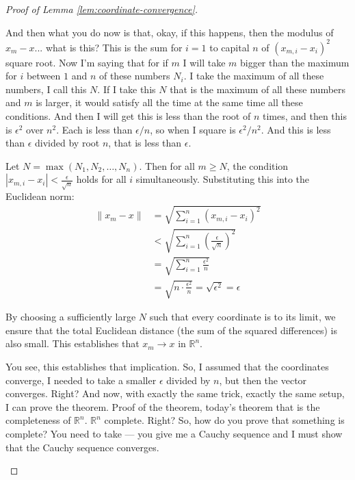 \begin{proof}[Proof of Lemma \ref{lem:coordinate-convergence}]
\begin{spoken-clean}[00:22:55 - 00:24:45]
And then what you do now is that, okay, if this happens, then the modulus of $x_m - x$... what is this? This is the sum for $i=1$ to capital $n$ of $(x_{m,i} - x_i)^2$ square root. Now I'm saying that for if $m$ I will take $m$ bigger than the maximum for $i$ between $1$ and $n$ of these numbers $N_i$. I take the maximum of all these numbers, I call this $N$. If I take this $N$ that is the maximum of all these numbers and $m$ is larger, it would satisfy all the time at the same time all these conditions. And then I will get this is less than the root of $n$ times, and then this is $\epsilon^2$ over $n^2$. Each is less than $\epsilon/n$, so when I square is $\epsilon^2/n^2$. And this is less than $\epsilon$ divided by root $n$, that is less than $\epsilon$.
\end{spoken-clean}

\begin{math-stroke}
Let $N = \max(N_1, N_2, \dots, N_n)$. Then for all $m \ge N$, the condition $|x_{m,i} - x_i| < \frac{\epsilon}{\sqrt{n}}$ holds for all $i$ simultaneously.
Substituting this into the Euclidean norm:
\begin{align*}
\|x_m - x\| &= \sqrt{\sum_{i=1}^n (x_{m,i} - x_i)^2} \\
&< \sqrt{\sum_{i=1}^n \left( \frac{\epsilon}{\sqrt{n}} \right)^2} \\
&= \sqrt{\sum_{i=1}^n \frac{\epsilon^2}{n}} \\
&= \sqrt{n \cdot \frac{\epsilon^2}{n}} = \sqrt{\epsilon^2} = \epsilon
\end{align*}
\begin{explanation-of-steps}
By choosing a sufficiently large $N$ such that every coordinate is  to its limit, we ensure that the total Euclidean distance (the sum of the squared differences) is also small. This establishes that $x_m \to x$ in $\mathbb{R}^n$.
\end{explanation-of-steps}
\end{math-stroke}

\begin{spoken-clean}[00:24:45 - 00:26:35]
You see, this establishes that implication. So, I assumed that the coordinates converge, I needed to take a smaller $\epsilon$ divided by $n$, but then the vector converges. Right? And now, with exactly the same trick, exactly the same setup, I can prove the theorem. Proof of the theorem, today's theorem that is the completeness of $\mathbb{R}^n$. $\mathbb{R}^n$ complete. Right? So, how do you prove that something is complete? You need to take --- you give me a Cauchy sequence and I must show that the Cauchy sequence converges.
\end{spoken-clean}


\end{proof}
